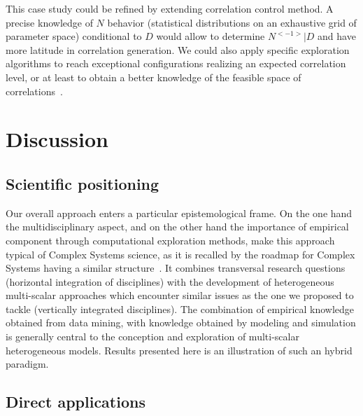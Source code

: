 \documentclass{bmcart}
\begin{document}
This case study could be refined by extending correlation control method. A precise knowledge of $N$ behavior (statistical distributions on an exhaustive grid of parameter space) conditional to $D$ would allow to determine $N^{<-1>} | D$ and have more latitude in correlation generation. We could also apply specific exploration algorithms to reach exceptional configurations realizing an expected correlation level, or at least to obtain a better knowledge of the feasible space of correlations~\cite{10.1371/journal.pone.0138212}.





\section*{Discussion}


\subsection*{Scientific positioning}


Our overall approach enters a particular epistemological frame. On the one hand the multidisciplinary aspect, and on the other hand the importance of empirical component through computational exploration methods, make this approach typical of Complex Systems science, as it is recalled by the roadmap for Complex Systems having a similar structure~\cite{2009arXiv0907.2221B}. It combines transversal research questions (horizontal integration of disciplines) with the development of heterogeneous multi-scalar approaches which encounter similar issues as the one we proposed to tackle (vertically integrated disciplines). The combination of empirical knowledge obtained from data mining, with knowledge obtained by modeling and simulation is generally central to the conception and exploration of multi-scalar heterogeneous models. Results presented here is an illustration of such an hybrid paradigm.



\subsection*{Direct applications}
\end{document}
